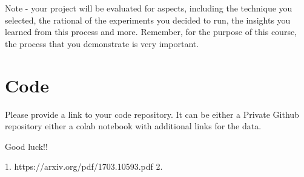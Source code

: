 \documentclass{article}
\begin{document}
Note - your project will be evaluated for aspects, including the technique you selected, the rational of the experiments you decided to run, the insights you learned from this process and more. Remember, for the purpose of this course, the process that you demonstrate is very  important.

\section{Code}

Please provide a link to your code repository. It can be either a Private Github repository either a colab notebook with additional links for the data.


Good luck!!


    1. https://arxiv.org/pdf/1703.10593.pdf
    2.
\end{document}
